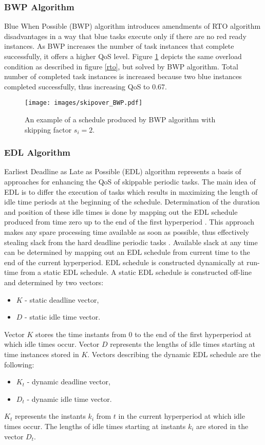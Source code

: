 \subsubsection{BWP Algorithm}
Blue When Possible (BWP) algorithm introduces amendments of RTO algorithm disadvantages in a way that blue tasks execute only if there are no red ready instances.
As BWP increases the number of task instances that complete successfully, it offers a higher QoS level. 
Figure \ref{bwp} depicts the same overload condition as described in figure 
\ref{rto}, but solved by BWP algorithm. 
Total number of completed task instances is increased because two blue instances completed successfully, thus increasing QoS to 0.67.
\\
\begin{figure}[ht]
    \centering
    \texttt{[image: images/skipover\_BWP.pdf]}
    \caption{An example of a schedule produced by BWP algorithm with skipping factor $s_i=2$.}
    \label{bwp}
\end{figure}

\subsubsection{EDL Algorithm}
Earliest Deadline as Late as Possible (EDL) algorithm represents a basis of approaches for enhancing the QoS of skippable periodic tasks.
The main idea of EDL is to differ the execution of tasks which results in maximizing the length of idle time periods at the beginning of the schedule.
Determination  of  the  duration  and  position  of  these  idle  times  is  done  by mapping out the EDL schedule produced from time zero up to the end of the first hyperperiod \cite{ghor2011real}.
This approach makes any spare processing time available as soon as possible, 
thus effectively stealing slack from the hard deadline periodic tasks 
\cite{queudet2012quality}. 
Available slack at any time can be determined by mapping out an EDL schedule from current time to the end of the current hyperperiod.
EDL schedule is constructed dynamically at run-time from a static EDL schedule.
A static EDL schedule is constructed off-line and determined by two vectors:
\begin{itemize}
	\item{$K$ - static deadline vector,}
	\item{$D$ - static idle time vector.}
\end{itemize}
Vector $K$ stores the time instants from 0 to the end of the first hyperperiod at which idle times occur. 
Vector $D$ represents the lengths of idle times starting at time instances stored in $K$.
Vectors describing the dynamic EDL schedule are the following:
\begin{itemize}
	\item{$K_t$} - dynamic deadline vector,
	\item{$D_t$} - dynamic idle time vector.
\end{itemize}
$K_t$ represents the instants $k_i$ from $t$ in the current hyperperiod at which idle times occur. 
The lengths of idle times starting at instants $k_i$ are stored in the vector $D_t$.

